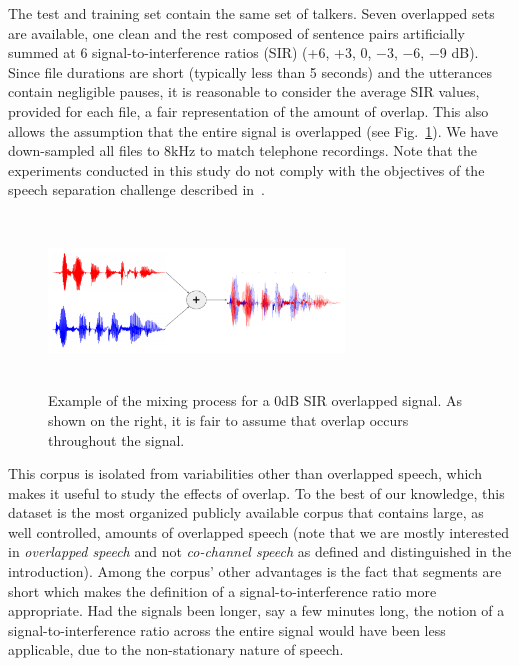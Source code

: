 {The test and training set contain the same set of talkers. Seven overlapped sets are available, one clean and the rest composed of sentence pairs artificially summed at 6 signal-to-interference ratios (SIR) (+6, +3, 0, −3, −6, −9 dB). 
Since file durations are short (typically less than 5 seconds) and the utterances contain negligible pauses, it is reasonable to consider the average SIR values, provided for each file, a fair representation of the amount of overlap. 
This also allows the assumption that the entire signal is overlapped (see Fig.~\ref{fig:overlap_example}). 
We have down-sampled all files to 8kHz to match telephone recordings. 
Note that the experiments conducted in this study do not comply with the objectives of the speech separation challenge described in~\cite{SSC_link}. 

\vspace{0mm}
\begin{figure}[h!]
	\centering
	\includegraphics[height =1.8in, width=0.7\textwidth]{figures/GRID_example_overlap-crop}
	\vspace{-2mm}
	\caption{
		Example of the mixing process for a 0dB SIR overlapped signal. As shown on the right, it is fair to assume that overlap occurs throughout the signal.}
	\label{fig:overlap_example}
\end{figure}

This corpus is isolated from variabilities other than overlapped speech, which makes it useful to study the effects of overlap. 
To the best of our knowledge, this dataset is the most organized publicly available corpus that contains large, as well controlled, amounts of overlapped speech (note that we are mostly interested in {\it overlapped speech} and not {\it co-channel speech} as defined and distinguished in the introduction). 
Among the corpus' other advantages is the fact that segments are short which makes the definition of a signal-to-interference ratio more appropriate. Had the signals been longer, say a few minutes long, the notion of a signal-to-interference ratio across the entire signal would have been less applicable, due to the non-stationary nature of speech. 

}
